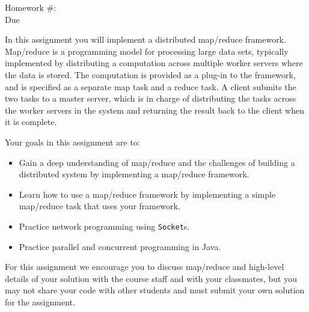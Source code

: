 \documentclass[11pt]{article}
\begin{document}
\begin{center}
{\Large Homework \#\hwNum: \hwTitle}\\
Due \dueDate
\end{center}

In this assignment you will implement a distributed map/reduce framework. 
Map/reduce is a programming model for processing large data sets, typically 
implemented by distributing a computation across multiple worker servers
where the data is stored. The computation is provided as a plug-in to the 
framework, and is specified as a separate map task and a reduce task. 
A client submits the two tasks to a master server, which is in charge of 
distributing the tasks across the worker servers in the system and 
returning the result back to the client when it is complete.

Your goals in this assignment are to:

\begin{itemize}
\item Gain a deep understanding of map/reduce and the challenges of
building a distributed system by implementing a map/reduce framework.
\item Learn how to use a map/reduce framework by implementing a simple
map/reduce task that uses your framework.
\item Practice network programming using {\tt Socket}s.
\item Practice parallel and concurrent programming in Java.
\end{itemize}

For this assignment we encourage you to discuss map/reduce and high-level
details of your solution with the course staff and with your 
classmates, but you may not share your code with other students
and must submit your own solution for the assignment.
\end{document}
